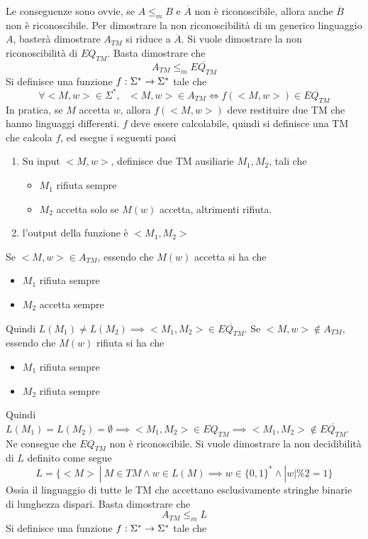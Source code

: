 \documentclass[10pt, letterpaper]{report}
\begin{document}
Le conseguenze sono ovvie, se $A\le_m B$ e $\overline A$ non è riconoscibile, allora anche $\overline B$ non è riconoscibile. Per dimostrare la non riconoscibilità di un generico linguaggio $A$, basterà dimostrare $A_{TM}$ si riduce a $\overline A$.
Si vuole dimostrare la non riconoscibilità di ${EQ_{TM}}$. 
Basta dimostrare che $$ A_{TM}\le_m  \overline{EQ_{TM}}$$Si definisce una funzione ${f:\Sigma^*\rightarrow \Sigma^*}$ tale che 
$$ \forall <M,w>\in\Sigma^*, \ \ \  <M,w>\in A_{TM}\iff f( <M,w>)\in \overline{EQ_{TM}}$$
In pratica, se $M$ accetta $w$, allora $f(<M,w>)$ deve restituire due TM che hanno linguaggi differenti.  
$f$ deve essere calcolabile, quindi si definisce una TM che calcola $f$, ed esegue i seguenti passi 
\begin{enumerate}
    \item  Su input $<M,w>$, definisce due TM ausiliarie $M_1,M_2$, tali che \begin{itemize}
        \item $M_1$ rifiuta sempre 
        \item $M_2$ accetta solo se $M(w)$ accetta, altrimenti rifiuta.
    \end{itemize}
    \item l'output della funzione è $<M_1,M_2>$
\end{enumerate}
\boxedMath{$\implies$} Se $<M,w>\in A_{TM}$, essendo che $M(w)$ accetta si ha che \begin{itemize}
    \item $M_1$ rifiuta sempre 
    \item  $M_2$ accetta sempre 
\end{itemize}
Quindi $L(M_1)\ne L(M_2)\implies <M_1,M_2>\in  \overline{EQ_{TM}}$.
\acc \boxedMath{$\impliedby$} Se $<M,w>\notin A_{TM}$, essendo che $M(w)$ rifiuta si ha che \begin{itemize}
    \item $M_1$ rifiuta sempre 
    \item  $M_2$ rifiuta sempre 
\end{itemize}
Quindi $L(M_1)=L(M_2)=\emptyset \implies <M_1,M_2>\in  {EQ_{TM}}\implies <M_1,M_2>\notin  \overline{EQ_{TM}}$. Ne consegue che $EQ_{TM}$ non è riconoscibile.
Si vuole dimostrare la non decidibilità di $L$ definito come segue 
$$ L=\{<M>\ | \ M\in TM \land w\in L(M)\implies w\in \{0,1\}^*\land |w|\%2=1\}$$ 
Ossia il linguaggio di tutte le TM che accettano esclusivamente stringhe binarie di lunghezza dispari.
Basta dimostrare che $$ A_{TM}\le_m  L$$Si definisce una funzione ${f:\Sigma^*\rightarrow \Sigma^*}$ tale che 
\end{document}
